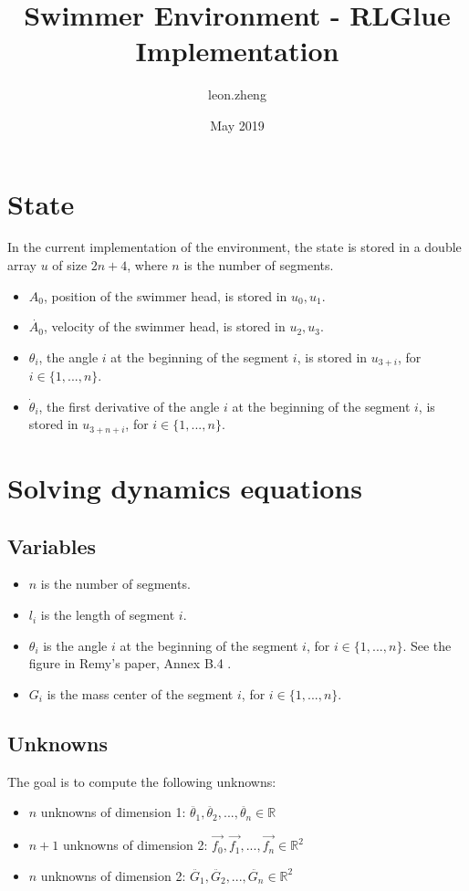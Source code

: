 \documentclass{article}
\title{Swimmer Environment - RLGlue Implementation}
\author{leon.zheng }
\date{May 2019}
\begin{document}
\maketitle

\section{State}

In the current implementation of the environment, the state is stored in a double array $u$ of size $2n+4$, where $n$ is the number of segments.
\begin{itemize}
    \item $A_0$, position of the swimmer head, is stored in $u_0, u_1$.
    \item $\dot{A_0}$, velocity of the swimmer head, is stored in $u_2, u_3$.
    \item $\theta_i$, the angle $i$ at the beginning of the segment $i$, is stored in $u_{3+i}$, for $i \in \{1, ..., n\}$.
    \item $\dot{\theta}_i$, the first derivative of the angle $i$ at the beginning of the segment $i$, is stored in $u_{3+n+i}$, for $i \in \{1, ..., n\}$.
\end{itemize}

\section{Solving dynamics equations}

\subsection{Variables}
\begin{itemize}
    \item $n$ is the number of segments.
    \item $l_i$ is the length of segment $i$.
    \item $\theta_i$ is the angle $i$ at the beginning of the segment $i$, for $i \in \{1, ..., n\}$. See the figure in Remy's paper, Annex B.4 \cite{Coulom-2002a}.
    \item $G_i$ is the mass center of the segment $i$, for $i \in \{1, ..., n\}$.
\end{itemize}

\subsection{Unknowns}
The goal is to compute the following unknowns:
\begin{itemize}
  \item $n$ unknowns of dimension 1: $\ddot{\theta_1}, \ddot{\theta_2}, ... , \ddot{\theta_n} \in \mathbb{R}$
  \item $n+1$ unknowns of dimension 2: $\vec{f_0}, \vec{f_1}, ..., \vec{f_n} \in \mathbb{R}^2$
  \item $n$ unknowns of dimension 2: $\ddot{G_1}, \ddot{G_2}, ..., \ddot{G_n} \in \mathbb{R}^2$
\end{itemize}
\end{document}

